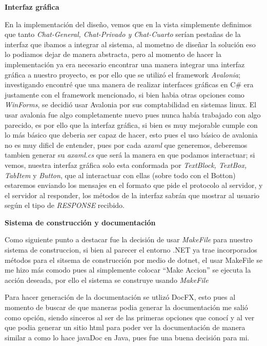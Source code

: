 \documentclass[10pt,letterpaper]{report}
\begin{document}
     \vspace{0.3cm}

            \noindent \textbf{Interfaz gráfica} 
    

     \noindent En la implementación del diseño, vemos que en la vista simplemente definimos que tanto \textit{Chat-General, Chat-Privado y Chat-Cuarto} serían pestañas de la interfaz que ibamos a integrar al sistema, al mometno de diseñar la solución eso lo podiamos dejar de manera abstracta, pero al momento de hacer la implementación ya era necesario encontrar una manera integrar una interfaz gráfica a nuestro proyecto, es por ello que se utilizó el framework \textit{Avalonia}; investigando encontré que una manera de realizar interfaces gráficas en C\# era justamente con el framework mencionado, si bien habia otras opciones como \textit{WinForms}, se decidió usar Avalonia por sus comptabilidad en sistemas linux. El usar avalonia fue algo completamente nuevo pues nunca había trabajado con algo parecido, es por ello que la interfaz gráfica, si bien es muy mejorable cumple con lo más básico que deberia ser capaz de hacer, esto pues el uso básico de avalonia no es muy dificl de entender, pues por cada \textit{axaml} que generemos, deberemos tambien generar su \textit{axaml.cs} que será la manera en que podamos interactuar; si vemos, nuestra interfaz gráfica solo esta conformada por \textit{TextBlock, TextBox, TabItem }y \textit{Button}, que al interactuar con ellas (sobre todo con el Botton) estaremos enviando los mensajes en el formato que pide el protocolo al servidor, y el servidor al responder, los métodos de la interfaz sabrán que mostrar al usuario según el tipo de \textit{RESPONSE} recibido.

        \vspace{0.3cm}

        \noindent \textbf{Sistema de construcción y documentación}
    
     \noindent Como siguiente punto a destacar fue la decisión de usar \textit{MakeFile} para nuestro sistema de construccion, si bien al parecer el entorno .NET ya trae incorporados métodos para el sitsema de construcción por medio de dotnet, el usar MakeFile se me hizo más comodo pues al simplemente colocar ``Make Accion'' se ejecuta la acción deseada, por ello el sistema se construye usando \textit{MakeFile}

     \noindent Para hacer generación de la documentación se utlizó DocFX, esto pues al momento de buscar de que maneras podia generar la documentación me salió como opción, siendo sinceros al ser de las primeras opciones que conocí y al ver que podia generar un sitio html para poder ver la documentación de manera similar a como lo hace javaDoc en Java, pues fue una buena decisión para mi.
\end{document}

